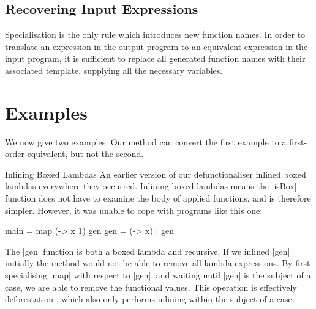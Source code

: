 \documentclass{sigplanconf}
\begin{document}
\subsection{Recovering Input Expressions}
\label{sec:recover}

Specialisation is the only rule which introduces new function names. In order to translate an expression in the output program to an equivalent expression in the input program, it is sufficient to replace all generated function names with their associated template, supplying all the necessary variables.

\section{Examples}
\label{sec:examples}

We now give two examples. Our method can convert the first example to a first-order equivalent, but not the second.

\begin{examplename}{Inlining Boxed Lambdas}
\label{ex:inlining_boxed_lambdas}
An earlier version of our defunctionaliser inlined boxed lambdas everywhere they occurred. Inlining boxed lambdas means the |isBox| function does not have to examine the body of applied functions, and is therefore simpler. However, it was unable to cope with programs like this one:

\begin{code}
main = map (\x -> x 1) gen
gen = (\x -> x) : gen
\end{code}

The |gen| function is both a boxed lambda and recursive. If we inlined |gen| initially the method would not be able to remove all lambda expressions. By first specialising |map| with respect to |gen|, and waiting until |gen| is the subject of a case, we are able to remove the functional values. This operation is effectively deforestation \cite{wadler:deforestation}, which also only performs inlining within the subject of a case.
\end{examplename}
\end{document}

